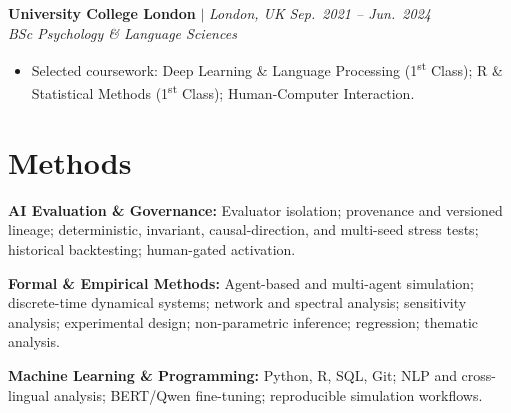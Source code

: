 \documentclass[11pt,a4paper]{article}
\begin{document}
\textbf{University College London} $|$ \textit{London, UK}
\hfill \textit{Sep.\ 2021 -- Jun.\ 2024}\\
\textit{BSc Psychology \& Language Sciences}
\begin{itemize}
  \item Selected coursework: Deep Learning \& Language Processing
        (1\textsuperscript{st} Class); R \& Statistical Methods
        (1\textsuperscript{st} Class); Human-Computer Interaction.
\end{itemize}


\section{Methods}
{\raggedright
\textbf{AI Evaluation \& Governance:} Evaluator isolation; provenance and versioned lineage; deterministic, invariant, causal-direction, and multi-seed stress tests; historical backtesting; human-gated activation.\par
\textbf{Formal \& Empirical Methods:} Agent-based and multi-agent simulation; discrete-time dynamical systems; network and spectral analysis; sensitivity analysis; experimental design; non-parametric inference; regression; thematic analysis.\par
\textbf{Machine Learning \& Programming:} Python, R, SQL, Git; NLP and cross-lingual analysis; BERT/Qwen fine-tuning; reproducible simulation workflows.\par
}
\end{document}
